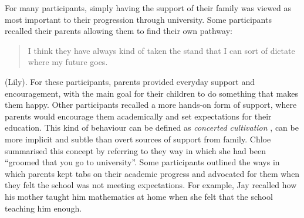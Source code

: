 For many participants, simply having the support of their family was viewed as most important to their progression through university. Some participants recalled their parents allowing them to find their own pathway: \blockquote{I think they have always kind of taken the stand that I can sort of dictate where my future goes.} (Lily). For these participants, parents provided everyday support and encouragement, with the main goal for their children to do something that makes them happy. Other participants recalled a more hands-on form of support, where parents would encourage them academically and set expectations for their education. This kind of behaviour can be defined as \textit{concerted cultivation} \citep{lareau2011unequal}, can be more implicit and subtle than overt sources of support from family. Chloe summarised this concept by referring to they way in which she had been ``groomed that you go to university''. Some participants outlined the ways in which parents kept tabs on their academic progress and advocated for them when they felt the school was not meeting expectations. For example, Jay recalled how his mother taught him mathematics at home when she felt that the school teaching him enough.

